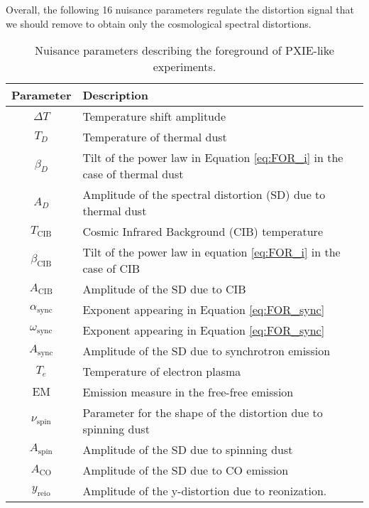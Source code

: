 Overall, the following 16 nuisance parameters regulate the distortion signal that we should remove to obtain only the cosmological spectral distortions.
\begin{table}[ht!]
\centering
\begin{tabular}{ c p{12cm} }
\hline
\textbf{Parameter} & \textbf{Description} \\
\hline
$\Delta T$      & Temperature shift amplitude \\
$T_D$           & Temperature of thermal dust \\
$\beta_D$       & Tilt of the power law in Equation \eqref{eq:FOR_i} in the case of thermal dust\\
$A_D$           & Amplitude of the spectral distortion (SD) due to thermal dust \\
$T_{\text{CIB}}$& Cosmic Infrared Background (CIB) temperature \\
$\beta_{\text{CIB}}$ & Tilt of the power law in equation \eqref{eq:FOR_i} in the case of CIB \\
$A_{\text{CIB}}$ & Amplitude of the SD due to CIB \\
$\alpha_{\text{sync}}$ & Exponent appearing in Equation \eqref{eq:FOR_sync} \\
$\omega_{\text{sync}}$ & Exponent appearing in Equation \eqref{eq:FOR_sync} \\
$A_{\text{sync}}$ & Amplitude of the SD due to synchrotron emission \\
$T_e$           & Temperature of electron plasma \\
$\mathrm{EM}$   & Emission measure in the free-free emission \\
$\nu_{\text{spin}}$ & Parameter for the shape of the distortion due to spinning dust \\
$A_{\text{spin}}$ & Amplitude of the SD due to spinning dust \\
$A_{\text{CO}}$ & Amplitude of the SD due to CO emission \\
$y_\text{reio}$ & Amplitude of the y-distortion due to reonization.\\
\hline
\end{tabular}
\caption{Nuisance parameters describing the foreground of PXIE-like experiments.}
\label{tab:nui_pixie}
\end{table}

